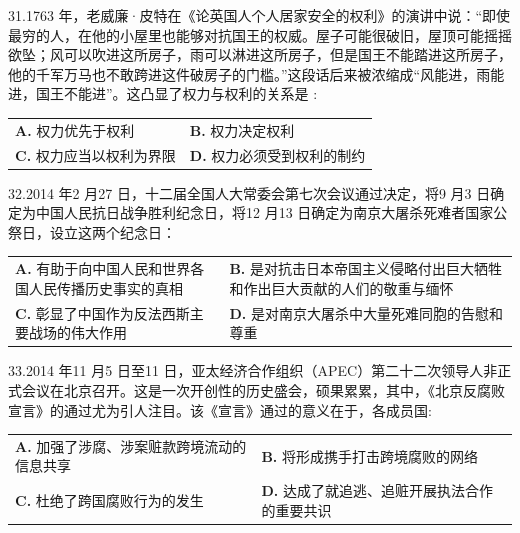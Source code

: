 \documentclass[UTF8,11pt]{ctexart}
\begin{document}
31.1763 年，老威廉·皮特在《论英国人个人居家安全的权利》的演讲中说：“即使最穷的人，在他的小屋里也能够对抗国王的权威。屋子可能很破旧，屋顶可能摇摇欲坠；风可以吹进这所房子，雨可以淋进这所房子，但是国王不能踏进这所房子，他的千军万马也不敢跨进这件破房子的门槛。”这段话后来被浓缩成“风能进，雨能进，国王不能进”。这凸显了权力与权利的关系是 :


\begin{center}\begin{tabular}{>{\raggedright\arraybackslash}p{\dimexpr(\linewidth-4\tabcolsep)/2\relax}>{\raggedright\arraybackslash}p{\dimexpr(\linewidth-4\tabcolsep)/2\relax}}
\textbf{A.} 权力优先于权利 & \textbf{B.} 权力决定权利\\[.35em]
\textbf{C.} 权力应当以权利为界限 & \textbf{D.} 权力必须受到权利的制约\\[.35em]\end{tabular}\end{center}

32.2014 年2 月27 日，十二届全国人大常委会第七次会议通过决定，将9 月3 日确定为中国人民抗日战争胜利纪念日，将12 月13 日确定为南京大屠杀死难者国家公祭日，设立这两个纪念日：


\begin{center}\begin{tabular}{>{\raggedright\arraybackslash}p{\dimexpr(\linewidth-4\tabcolsep)/2\relax}>{\raggedright\arraybackslash}p{\dimexpr(\linewidth-4\tabcolsep)/2\relax}}
\textbf{A.} 有助于向中国人民和世界各国人民传播历史事实的真相 & \textbf{B.} 是对抗击日本帝国主义侵略付出巨大牺牲和作出巨大贡献的人们的敬重与缅怀\\[.35em]
\textbf{C.} 彰显了中国作为反法西斯主要战场的伟大作用 & \textbf{D.} 是对南京大屠杀中大量死难同胞的告慰和尊重\\[.35em]\end{tabular}\end{center}

33.2014 年11 月5 日至11 日，亚太经济合作组织（APEC）第二十二次领导人非正式会议在北京召开。这是一次开创性的历史盛会，硕果累累，其中，《北京反腐败宣言》的通过尤为引人注目。该《宣言》通过的意义在于，各成员国:


\begin{center}\begin{tabular}{>{\raggedright\arraybackslash}p{\dimexpr(\linewidth-4\tabcolsep)/2\relax}>{\raggedright\arraybackslash}p{\dimexpr(\linewidth-4\tabcolsep)/2\relax}}
\textbf{A.} 加强了涉腐、涉案赃款跨境流动的信息共享 & \textbf{B.} 将形成携手打击跨境腐败的网络\\[.35em]
\textbf{C.} 杜绝了跨国腐败行为的发生 & \textbf{D.} 达成了就追逃、追赃开展执法合作的重要共识\\[.35em]\end{tabular}\end{center}
\end{document}

